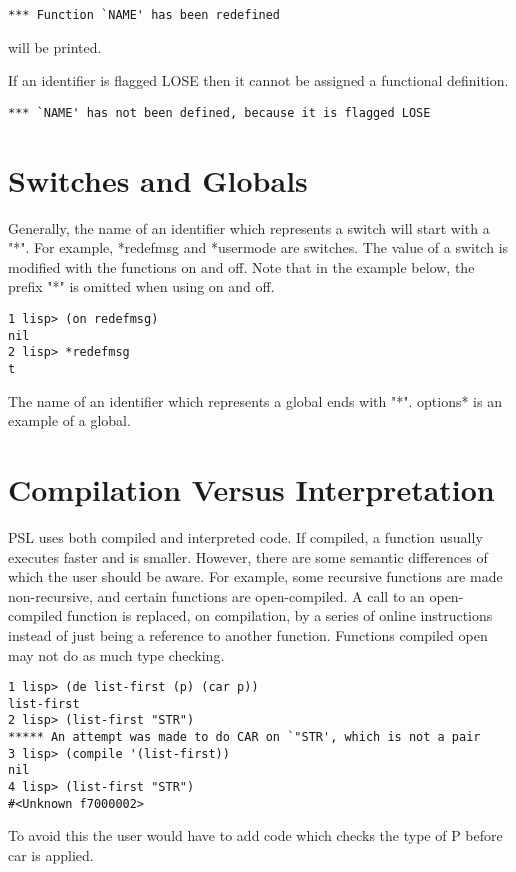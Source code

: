 \begin{verbatim}
*** Function `NAME' has been redefined
\end{verbatim}
will be printed.

\noindent
If  an identifier is flagged LOSE then it cannot be
assigned a functional definition.

\begin{verbatim}
*** `NAME' has not been defined, because it is flagged LOSE
\end{verbatim}

\section{Switches and Globals}

Generally, the name of an identifier which represents a switch
will start with a "*".  For example, *redefmsg 
and *usermode are
switches.  The value of a switch is modified with the  functions
on  and  off.  Note that in the example below, the prefix "*" is
omitted when using on and off.

\begin{verbatim}
1 lisp> (on redefmsg)
nil
2 lisp> *redefmsg
t
\end{verbatim}
The name of an identifier which represents a  global  ends  with
"*".  options* is an example of a global.

\section{Compilation Versus Interpretation}

  PSL  uses  both compiled and interpreted code.  If compiled, a
function usually executes faster and is smaller.  However, there
are some semantic differences of which the user should be aware.
For example, some recursive functions  are  made  non-recursive,
and   certain  functions  are  open-compiled.    A  call  to  an
open-compiled function is replaced, on compilation, by a  series
of  online  instructions  instead  of  just being a reference to
another function.  Functions compiled open may not  do  as  much
type checking.

\begin{verbatim}
1 lisp> (de list-first (p) (car p))
list-first
2 lisp> (list-first "STR")
***** An attempt was made to do CAR on `"STR', which is not a pair 
3 lisp> (compile '(list-first))
nil
4 lisp> (list-first "STR")
#<Unknown f7000002>
\end{verbatim}
To  avoid  this the user would have to add code which checks the
type of P before car is applied.

